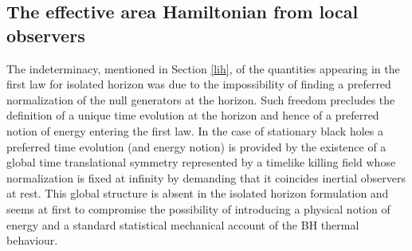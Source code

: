 \documentclass[aps, nofootinbib,superscriptaddress,12pt]{revtex4-2}
\begin{document}
%
%
%

\subsection{The effective area Hamiltonian from local observers}\label{nhg}


The indeterminacy, mentioned in Section \ref{lih}, of the quantities appearing in the first law for isolated horizon was due to the impossibility of finding a preferred normalization of the null generators at the horizon. Such freedom precludes the definition of a unique time evolution at the horizon and hence of a preferred notion of energy entering the first law. In the case of stationary black holes  a preferred time evolution (and energy notion) is provided by the existence of a global time translational symmetry represented by a timelike killing field whose normalization is fixed at infinity by demanding that it coincides inertial observers at rest. This global structure is absent in the isolated horizon formulation and seems at first to compromise the possibility of introducing a physical notion of energy and a standard statistical mechanical account of the BH thermal behaviour.
\end{document}
